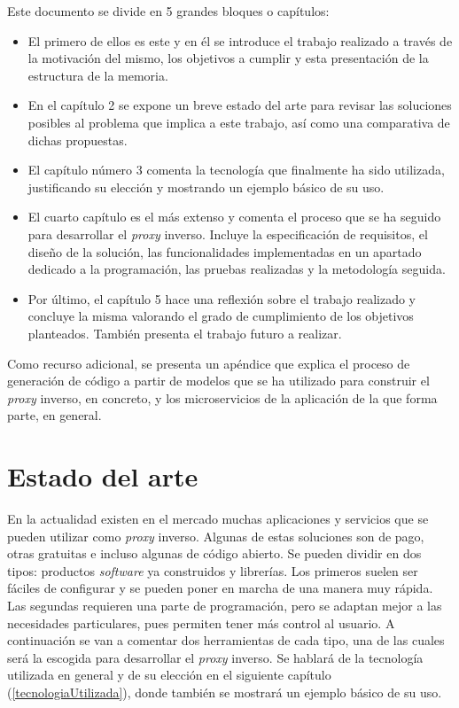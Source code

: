 \documentclass[11pt,spanish,listoffigures]{tfgetsinf}
\begin{document}
Este documento se divide en 5 grandes bloques o capítulos:

\begin{itemize}

	\item El primero de ellos es este y en él se introduce el trabajo realizado a través de la motivación del mismo, los objetivos a cumplir y esta presentación de la estructura de la memoria.

	\item En el capítulo 2 se expone un breve estado del arte para revisar las soluciones posibles al problema que implica a este trabajo, así como una comparativa de dichas propuestas.

	\item El capítulo número 3 comenta la tecnología que finalmente ha sido utilizada, justificando su elección y mostrando un ejemplo básico de su uso.

	\item El cuarto capítulo es el más extenso y comenta el proceso que se ha seguido para desarrollar el \emph{proxy} inverso. Incluye la especificación de requisitos, el diseño de la solución, las funcionalidades implementadas en un apartado dedicado a la programación, las pruebas realizadas y la metodología seguida.

	\item Por último, el capítulo 5 hace una reflexión sobre el trabajo realizado y concluye la misma valorando el grado de cumplimiento de los objetivos planteados. También presenta el trabajo futuro a realizar.

\end{itemize}

Como recurso adicional, se presenta un apéndice que explica el proceso de generación de código a partir de modelos que se ha utilizado para construir el \emph{proxy} inverso, en concreto, y los microservicios de la aplicación de la que forma parte, en general.


\chapter{Estado del arte} \label{estadoDelArte}

En la actualidad existen en el mercado muchas aplicaciones y servicios que se pueden utilizar como \emph{proxy} inverso. Algunas de estas soluciones son de pago, otras gratuitas e incluso algunas de código abierto. Se pueden dividir en dos tipos: productos \emph{software} ya construidos y librerías. Los primeros suelen ser fáciles de configurar y se pueden poner en marcha de una manera muy rápida. Las segundas requieren una parte de programación, pero se adaptan mejor a las necesidades particulares, pues permiten tener más control al usuario. A continuación se van a comentar dos herramientas de cada tipo, una de las cuales será la escogida para desarrollar el \emph{proxy} inverso. Se hablará de la tecnología utilizada en general y de su elección en el siguiente capítulo (\ref{tecnologiaUtilizada}), donde también se mostrará un ejemplo básico de su uso.
\end{document}
